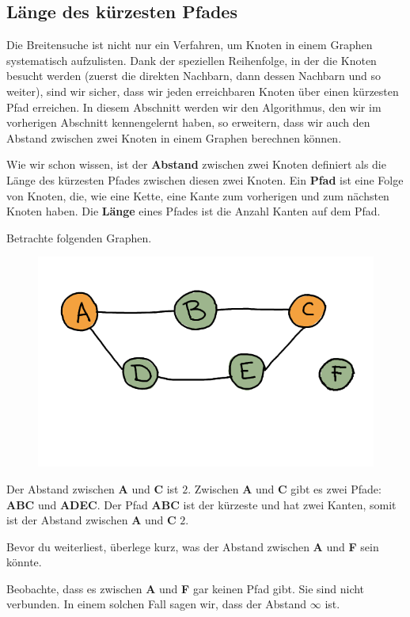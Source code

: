 \subsection{Länge des kürzesten Pfades}

Die Breitensuche ist nicht nur ein Verfahren, um Knoten in einem Graphen systematisch aufzulisten. Dank der speziellen Reihenfolge, in der die Knoten besucht werden (zuerst die direkten Nachbarn, dann dessen Nachbarn und so weiter), sind wir sicher, dass wir jeden erreichbaren Knoten über einen kürzesten Pfad erreichen. In diesem Abschnitt werden wir den Algorithmus, den wir im vorherigen Abschnitt kennengelernt haben, so erweitern, dass wir auch den Abstand zwischen zwei Knoten in einem Graphen berechnen können.

Wie wir schon wissen, ist der \textbf{Abstand} zwischen zwei Knoten definiert als die Länge des kürzesten Pfades zwischen diesen zwei Knoten. Ein \textbf{Pfad} ist eine Folge von Knoten, die, wie eine Kette, eine Kante zum vorherigen und zum nächsten Knoten haben. Die \textbf{Länge} eines Pfades ist die Anzahl Kanten auf dem Pfad.

\begin{beispiel}
Betrachte folgenden Graphen.
\begin{figure}[H]
\centering
\includegraphics[width=0.5\linewidth]{Pictures/SP/abstand_def.png} 
\end{figure}
Der Abstand zwischen \textbf{A} und \textbf{C} ist \(2\). Zwischen \textbf{A} und \textbf{C} gibt es zwei Pfade: \textbf{ABC} und \textbf{ADEC}. Der Pfad \textbf{ABC} ist der kürzeste und hat zwei Kanten, somit ist der Abstand zwischen \textbf{A} und \textbf{C} \(2\).

Bevor du weiterliest, überlege kurz, was der Abstand zwischen \textbf{A} und \textbf{F} sein könnte.

Beobachte, dass es zwischen \textbf{A} und \textbf{F} gar keinen Pfad gibt. Sie sind nicht verbunden. In einem solchen Fall sagen wir, dass der Abstand \(\infty\) ist.
\end{beispiel}


